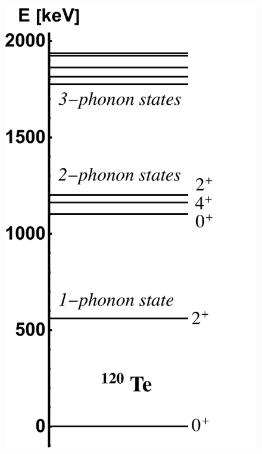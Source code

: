 \begin{figure}
    \centering
    \includegraphics[scale=0.37]{Chapters/Figures/120Te_vib_experimental.pdf}

\end{figure}
